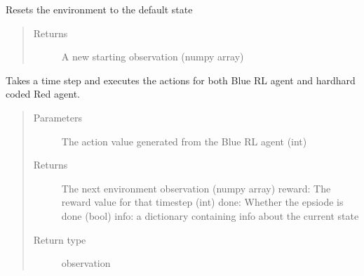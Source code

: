 \documentclass[letterpaper,10pt,english]{sphinxmanual}
\begin{document}
\begin{fulllineitems}
\begin{fulllineitems}
\begin{quote}
\begin{description}
\end{description}\end{quote}

\end{fulllineitems}


\begin{fulllineitems}
\label{\detokenize{source/yawning_titan.envs.specific:yawning_titan.envs.specific.nsa_node_def.NodeEnv.reset}}
\sphinxAtStartPar
Resets the environment to the default state
\begin{quote}\begin{description}
\item[{Returns}] \leavevmode
\sphinxAtStartPar
A new starting observation (numpy array)

\end{description}\end{quote}

\end{fulllineitems}


\begin{fulllineitems}
\label{\detokenize{source/yawning_titan.envs.specific:yawning_titan.envs.specific.nsa_node_def.NodeEnv.step}}
\sphinxAtStartPar
Takes a time step and executes the actions for both Blue RL agent and
hard\sphinxhyphen{}hard coded Red agent.
\begin{quote}\begin{description}
\item[{Parameters}] \leavevmode
\sphinxAtStartPar
{} \textendash{} The action value generated from the Blue RL agent (int)

\item[{Returns}] \leavevmode
\sphinxAtStartPar
The next environment observation (numpy array)
reward: The reward value for that timestep (int)
done: Whether the epsiode is done (bool)
info: a dictionary containing info about the current state

\item[{Return type}] \leavevmode
\sphinxAtStartPar
observation

\end{description}\end{quote}

\end{fulllineitems}


\end{fulllineitems}
\end{document}
